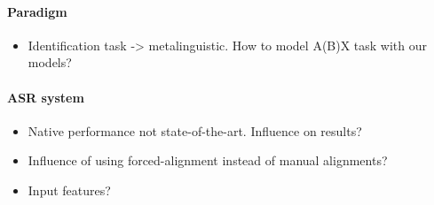 \paragraph{Paradigm}
\begin{itemize}
  \item Identification task -> metalinguistic. How to model A(B)X task with our models?
  \end{itemize}

\paragraph{ASR system}
\begin{itemize}
\item Native performance not state-of-the-art. Influence on results?
\item Influence of using forced-alignment instead of manual alignments?
  \item Input features?
  \end{itemize}

  
